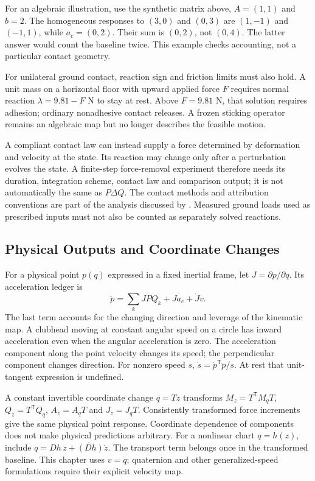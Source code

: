 For an algebraic illustration, use the synthetic matrix above, $A=(1,1)$ and $b=2$. The homogeneous responses to $(3,0)$ and $(0,3)$ are $(1,-1)$ and $(-1,1)$, while $a_c=(0,2)$. Their sum is $(0,2)$, not $(0,4)$. The latter answer would count the baseline twice. This example checks accounting, not a particular contact geometry.

For unilateral ground contact, reaction sign and friction limits must also hold. A unit mass on a horizontal floor with upward applied force $F$ requires normal reaction $\lambda=9.81-F$ N to stay at rest. Above $F=9.81$ N, that solution requires adhesion; ordinary nonadhesive contact releases. A frozen sticking operator remains an algebraic map but no longer describes the feasible motion.

A compliant contact law can instead supply a force determined by deformation and velocity at the state. Its reaction may change only after a perturbation evolves the state. A finite-step force-removal experiment therefore needs its duration, integration scheme, contact law and comparison output; it is not automatically the same as $P\Delta Q$. The contact methods and attribution conventions are part of the analysis discussed by \cite{Silverman2014}. Measured ground loads used as prescribed inputs must not also be counted as separately solved reactions.

\subsection{Physical Outputs and Coordinate Changes}

For a physical point $p(q)$ expressed in a fixed inertial frame, let $J=\partial p/\partial q$. Its acceleration ledger is
\[
\ddot p=\sum_k JPQ_k+Ja_c+\dot Jv.
\]
The last term accounts for the changing direction and leverage of the kinematic map. A clubhead moving at constant angular speed on a circle has inward acceleration even when the angular acceleration is zero. The acceleration component along the point velocity changes its speed; the perpendicular component changes direction. For nonzero speed $s$, $\dot s=\dot p^{\mathsf T}\ddot p/s$. At rest that unit-tangent expression is undefined.

A constant invertible coordinate change $q=Tz$ transforms $M_z=T^{\mathsf T}M_qT$, $Q_z=T^{\mathsf T}Q_q$, $A_z=A_qT$ and $J_z=J_qT$. Consistently transformed force increments give the same physical point response. Coordinate dependence of components does not make physical predictions arbitrary. For a nonlinear chart $q=h(z)$, include $\ddot q=Dh\,\ddot z+\dot{(Dh)}\dot z$. The transport term belongs once in the transformed baseline. This chapter uses $v=\dot q$; quaternion and other generalized-speed formulations require their explicit velocity map.

